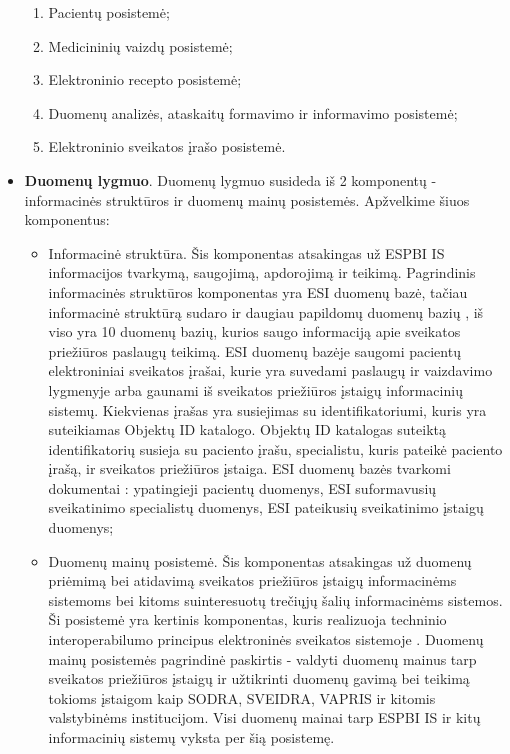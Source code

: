 \begin{itemize}
    \begin{enumerate}
        \item Pacientų posistemė;
        \item Medicininių  vaizdų posistemė;
        \item Elektroninio recepto posistemė;
        \item Duomenų analizės, ataskaitų formavimo ir informavimo posistemė;
        \item Elektroninio sveikatos įrašo posistemė.
    \end{enumerate}
    \item \textbf{Duomenų lygmuo}. Duomenų lygmuo susideda iš 2 komponentų - informacinės struktūros ir duomenų mainų posistemės. Apžvelkime šiuos komponentus:
    \begin{itemize}
        \item Informacinė struktūra. Šis komponentas atsakingas už ESPBI IS informacijos tvarkymą, saugojimą, apdorojimą ir teikimą. Pagrindinis informacinės struktūros komponentas yra ESI duomenų bazė, tačiau informacinė struktūrą sudaro ir daugiau papildomų duomenų bazių \cite{Specifikacija}, iš viso yra 10 duomenų bazių, kurios saugo informaciją apie sveikatos priežiūros paslaugų teikimą. ESI duomenų bazėje saugomi pacientų elektroniniai sveikatos įrašai, kurie yra suvedami paslaugų ir vaizdavimo lygmenyje arba gaunami iš sveikatos priežiūros įstaigų informacinių sistemų. Kiekvienas įrašas yra susiejimas su identifikatoriumi, kuris yra suteikiamas Objektų ID katalogo. Objektų ID katalogas suteiktą identifikatorių susieja su paciento įrašu, specialistu, kuris pateikė paciento įrašą, ir sveikatos priežiūros įstaiga. ESI duomenų bazės tvarkomi dokumentai \cite{Specifikacija}: ypatingieji pacientų duomenys, ESI suformavusių sveikatinimo specialistų duomenys, ESI pateikusių sveikatinimo įstaigų duomenys;
        \item Duomenų mainų posistemė. Šis komponentas atsakingas už duomenų priėmimą bei atidavimą sveikatos priežiūros įstaigų informacinėms sistemoms bei kitoms suinteresuotų trečiųjų šalių informacinėms sistemos. Ši posistemė yra kertinis komponentas, kuris realizuoja techninio interoperabilumo principus elektroninės sveikatos sistemoje \cite{Specifikacija}. Duomenų mainų posistemės pagrindinė paskirtis - valdyti duomenų mainus tarp sveikatos priežiūros įstaigų ir užtikrinti duomenų gavimą bei teikimą tokioms įstaigom kaip SODRA, SVEIDRA, VAPRIS ir kitomis valstybinėms institucijom. Visi duomenų mainai tarp ESPBI IS ir kitų informacinių sistemų vyksta per šią posistemę.
    \end{itemize}
\end{itemize}


